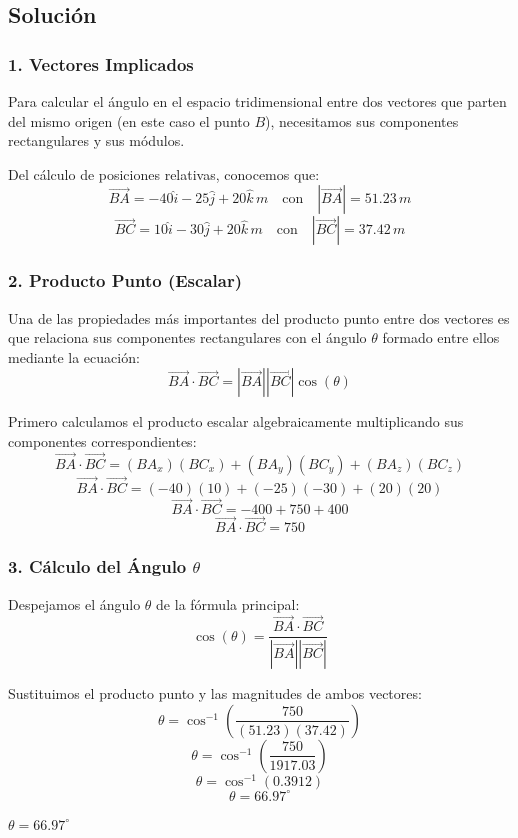 \documentclass[12pt, a4paper]{article}
\begin{document}
\subsection*{Solución}

\subsubsection*{1. Vectores Implicados}
Para calcular el ángulo en el espacio tridimensional entre dos vectores que parten del mismo origen (en este caso el punto $B$), necesitamos sus componentes rectangulares y sus módulos.

Del cálculo de posiciones relativas, conocemos que:
$$\vec{BA} = -40\hat{i} - 25\hat{j} + 20\hat{k} \, \si{m} \quad \text{con} \quad |\vec{BA}| = 51.23 \, \si{m}$$
$$\vec{BC} = 10\hat{i} - 30\hat{j} + 20\hat{k} \, \si{m} \quad \text{con} \quad |\vec{BC}| = 37.42 \, \si{m}$$

\subsubsection*{2. Producto Punto (Escalar)}
Una de las propiedades más importantes del producto punto entre dos vectores es que relaciona sus componentes rectangulares con el ángulo $\theta$ formado entre ellos mediante la ecuación:
$$\vec{BA} \cdot \vec{BC} = |\vec{BA}| |\vec{BC}| \cos(\theta)$$

Primero calculamos el producto escalar algebraicamente multiplicando sus componentes correspondientes:
$$\vec{BA} \cdot \vec{BC} = (BA_x)(BC_x) + (BA_y)(BC_y) + (BA_z)(BC_z)$$
$$\vec{BA} \cdot \vec{BC} = (-40)(10) + (-25)(-30) + (20)(20)$$
$$\vec{BA} \cdot \vec{BC} = -400 + 750 + 400$$
$$\vec{BA} \cdot \vec{BC} = 750$$

\subsubsection*{3. Cálculo del Ángulo $\theta$}
Despejamos el ángulo $\theta$ de la fórmula principal:
$$\cos(\theta) = \frac{\vec{BA} \cdot \vec{BC}}{|\vec{BA}| |\vec{BC}|}$$

Sustituimos el producto punto y las magnitudes de ambos vectores:
$$\theta = \cos^{-1} \left( \frac{750}{(51.23)(37.42)} \right)$$
$$\theta = \cos^{-1} \left( \frac{750}{1917.03} \right)$$
$$\theta = \cos^{-1} (0.3912)$$
$$\theta = 66.97^\circ$$

\begin{tcolorbox}[colback=green!5!white, colframe=green!50!black, title=Respuesta Final]
\centering \Large $\theta = 66.97^\circ$
\end{tcolorbox}
\end{document}
